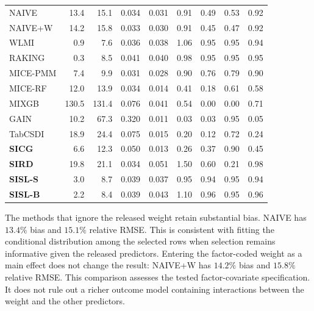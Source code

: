 \begin{table}[!htbp]
{\begin{tabular}{lrrrrrrrr}
NAIVE & 13.4 & 15.1 & 0.034 & 0.031 & 0.91 & 0.49 & 0.53 & 0.92 \\
NAIVE+W & 14.2 & 15.8 & 0.033 & 0.030 & 0.91 & 0.45 & 0.47 & 0.92 \\
WLMI & \cellcolor{ranktwo}0.9 & \cellcolor{rankone}7.6 & 0.036 & 0.038 & 1.06 & \cellcolor{rankone}0.95 & \cellcolor{rankone}0.95 & \cellcolor{ranktwo}0.94 \\
RAKING & \cellcolor{rankone}0.3 & \cellcolor{rankthree}8.5 & 0.041 & 0.040 & \cellcolor{ranktwo}0.98 & \cellcolor{rankone}0.95 & \cellcolor{rankone}0.95 & \cellcolor{rankone}0.95 \\
MICE-PMM & 7.4 & 9.9 & 0.031 & 0.028 & 0.90 & \cellcolor{rankthree}0.76 & \cellcolor{rankthree}0.79 & 0.90 \\
MICE-RF & 12.0 & 13.9 & 0.034 & 0.014 & 0.41 & 0.18 & 0.61 & 0.58 \\
MIXGB & 130.5 & 131.4 & 0.076 & 0.041 & 0.54 & 0.00 & 0.00 & 0.71 \\
GAIN & 10.2 & 67.3 & 0.320 & 0.011 & 0.03 & 0.03 & \cellcolor{rankone}0.95 & 0.05 \\
TabCSDI & 18.9 & 24.4 & 0.075 & 0.015 & 0.20 & 0.12 & 0.72 & 0.24 \\
\textbf{SICG} & 6.6 & 12.3 & 0.050 & 0.013 & 0.26 & 0.37 & \cellcolor{ranktwo}0.90 & 0.45 \\
\textbf{SIRD} & 19.8 & 21.1 & 0.034 & 0.051 & 1.50 & 0.60 & 0.21 & 0.98 \\
\textbf{SISL-S} & 3.0 & 8.7 & 0.039 & 0.037 & \cellcolor{rankthree}0.95 & \cellcolor{ranktwo}0.94 & \cellcolor{rankone}0.95 & \cellcolor{ranktwo}0.94 \\
\textbf{SISL-B} & \cellcolor{rankthree}2.2 & \cellcolor{ranktwo}8.4 & 0.039 & 0.043 & 1.10 & \cellcolor{ranktwo}0.96 & \cellcolor{rankone}0.95 & \cellcolor{ranktwo}0.96 \\
\bottomrule
\end{tabular}}
\end{table}

The methods that ignore the released weight retain substantial bias. NAIVE has $13.4\%$ bias and $15.1\%$ relative RMSE. This is consistent with fitting the conditional distribution among the selected rows when selection remains informative given the released predictors. Entering the factor-coded weight as a main effect does not change the result: NAIVE+W has $14.2\%$ bias and $15.8\%$ relative RMSE. This comparison assesses the tested factor-covariate specification. It does not rule out a richer outcome model containing interactions between the weight and the other predictors.

